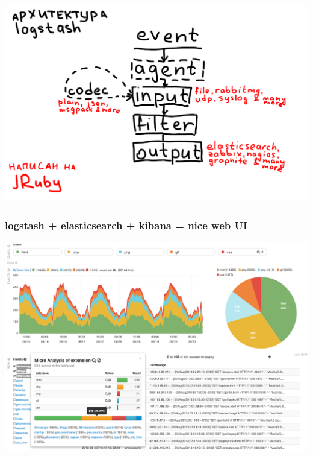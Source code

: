 \documentclass[aspectratio=169]{beamer}
\begin{document}
\begin{frame}
  \begin{center}
    \includegraphics[scale=0.63]{img/logstash.png}
  \end{center}
\end{frame}


\begin{frame}
  \frametitle{logstash + elasticsearch + kibana = nice web UI}

  \begin{center}
    \includegraphics[scale=0.46]{img/kibana.png}
  \end{center}

\end{frame}
\end{document}
